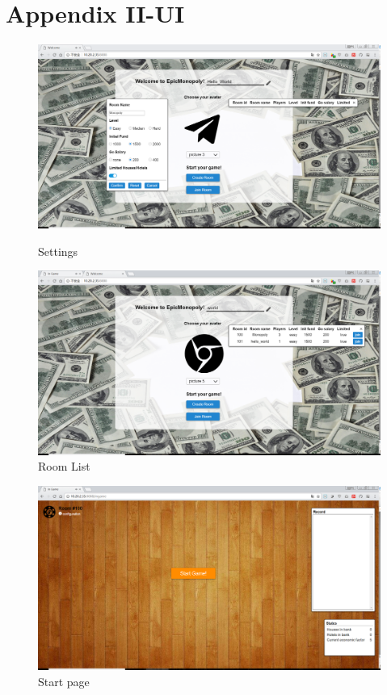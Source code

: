 \documentclass[a4paper,12pt]{article}
\begin{document}
\section*{Appendix II-UI}
\begin{figure}[htbp]
\includegraphics[scale=0.32]{image/login.png}
\caption{Settings}
\includegraphics[scale=0.32]{image/login1.png}
\caption{Room List}
\end{figure}
\begin{figure}[htbp]
\includegraphics[scale=0.32]{image/start_game.png}
\caption{Start page}
\end{figure}
\end{document}
